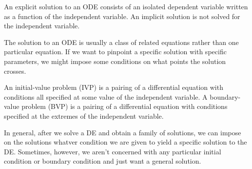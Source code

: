 \documentclass[../m82main.tex]{subfiles}
\begin{document}
\begin{definition}
    An explicit solution to an ODE consists of an isolated dependent variable written as a function of the independent variable.
    An implicit solution is not solved for the independent variable.
\end{definition}

The solution to an ODE is usually a class of related equations rather than one particular equation.
If we want to pinpoint a specific solution with specific parameters, we might impose some conditions on what points the solution crosses.

\begin{definition}
    An initial-value problem (IVP) is a pairing of a differential equation with conditions all specified at some value of the independent variable.
    A boundary-value problem (BVP) is a pairing of a differential equation with conditions specified at the extremes of the independent variable.
\end{definition}

In general, after we solve a DE and obtain a family of solutions, we can impose on the solutions whatver condition we are given to yield a specific solution to the DE.
Sometimes, however, we aren't concerned with any particular initial condition or boundary condition and just want a general solution.
\end{document}
